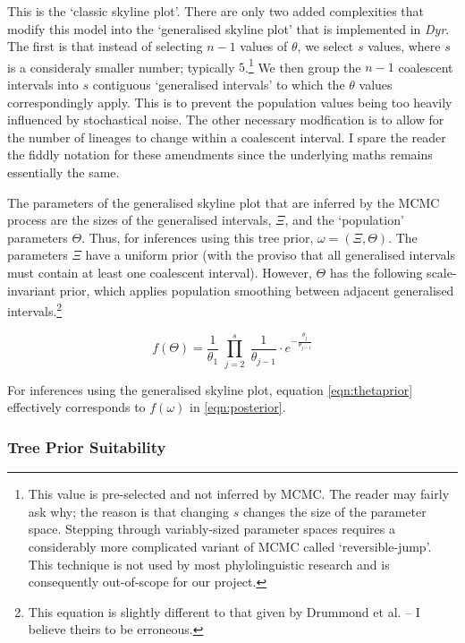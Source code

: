 \documentclass[10pt,journal,compsoc]{IEEEtran}
\begin{document}
This is the `classic skyline plot'. There are only two added complexities that modify this model into the `generalised skyline plot' that is implemented in \textit{Dyr}. The first is that instead of selecting $n - 1$ values of $\theta$, we select $s$ values, where $s$ is a consideraly smaller number; typically $5$.\footnote{This value is pre-selected and not inferred by MCMC. The reader may fairly ask why; the reason is that changing $s$ changes the size of the parameter space. Stepping through variably-sized parameter spaces requires a considerably more complicated variant of MCMC called `reversible-jump'. This technique is not used by most phylolinguistic research and is consequently out-of-scope for our project.} We then group the $n - 1$ coalescent intervals into $s$ contiguous `generalised intervals' to which the $\theta$ values correspondingly apply. This is to prevent the population values being too heavily influenced by stochastical noise. The other necessary modfication is to allow for the number of lineages to change within a coalescent interval. I spare the reader the fiddly notation for these amendments since the underlying maths remains essentially the same.

The parameters of the generalised skyline plot that are inferred by the MCMC process are the sizes of the generalised intervals, $\Xi$, and the `population' parameters $\Theta$. Thus, for inferences using this tree prior, $\omega = (\Xi, \Theta)$. The parameters $\Xi$ have a uniform prior (with the proviso that all generalised intervals must contain at least one coalescent interval). However, $\Theta$ has the following scale-invariant prior, which applies population smoothing between adjacent generalised intervals.\footnote{This equation is slightly different to that given by Drummond et al. -- I believe theirs to be erroneous.}

\begin{equation}\label{eqn:thetaprior}
    f(\Theta) = \frac{1}{\theta_1} \; \prod_{j=2}^s\; \frac{1}{\theta_{j-1}} \cdot e^{-\frac{\theta_j}{\theta_{j-1}}}
\end{equation}

For inferences using the generalised skyline plot, equation \eqref{eqn:thetaprior} effectively corresponds to $f(\omega)$ in \eqref{eqn:posterior}.

\subsubsection{Tree Prior Suitability}
\end{document}
